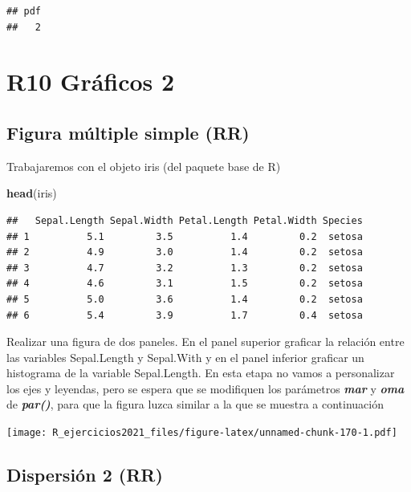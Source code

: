 \documentclass[]{book}
\newenvironment{Shaded}{\begin{snugshade}}{\end{snugshade}}
\newcommand{\KeywordTok}[1]{\textcolor[rgb]{0.13,0.29,0.53}{\textbf{#1}}}
\newcommand{\NormalTok}[1]{#1}
\begin{document}
\begin{verbatim}
## pdf 
##   2
\end{verbatim}

\hypertarget{r10-gruxe1ficos-2}{%
\chapter*{R10 Gráficos 2}\label{r10-gruxe1ficos-2}}

\hypertarget{figura-muxfaltiple-simple-rr}{%
\section{Figura múltiple simple (RR)}\label{figura-muxfaltiple-simple-rr}}

Trabajaremos con el objeto iris (del paquete base de R)

\begin{Shaded}
\begin{Highlighting}[]
\KeywordTok{head}\NormalTok{(iris)}
\end{Highlighting}
\end{Shaded}

\begin{verbatim}
##   Sepal.Length Sepal.Width Petal.Length Petal.Width Species
## 1          5.1         3.5          1.4         0.2  setosa
## 2          4.9         3.0          1.4         0.2  setosa
## 3          4.7         3.2          1.3         0.2  setosa
## 4          4.6         3.1          1.5         0.2  setosa
## 5          5.0         3.6          1.4         0.2  setosa
## 6          5.4         3.9          1.7         0.4  setosa
\end{verbatim}

Realizar una figura de dos paneles. En el panel superior graficar la relación entre las variables Sepal.Length y Sepal.With y en el panel inferior graficar un histograma de la variable Sepal.Length. En esta etapa no vamos a personalizar los ejes y leyendas, pero se espera que se modifiquen los parámetros \emph{\textbf{mar}} y \emph{\textbf{oma}} de \emph{\textbf{par()}}, para que la figura luzca similar a la que se muestra a continuación

\texttt{[image: R\_ejercicios2021\_files/figure-latex/unnamed-chunk-170-1.pdf]}

\hypertarget{dispersiuxf3n-2-rr}{%
\section{Dispersión 2 (RR)}\label{dispersiuxf3n-2-rr}}
\end{document}
